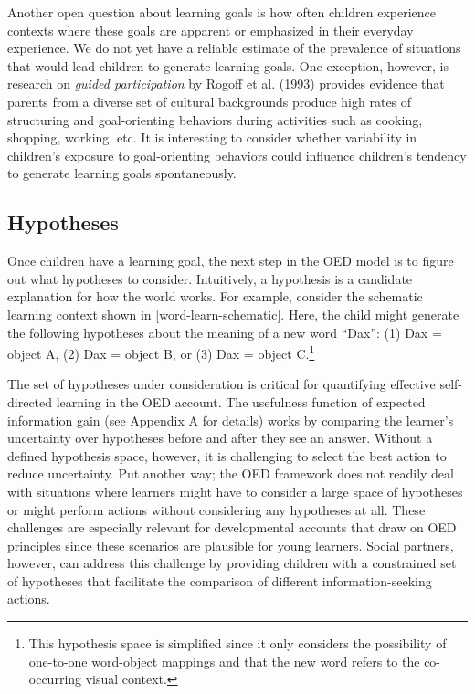 \documentclass[oneside]{report}
\begin{document}
Another open question about learning goals is how often children
experience contexts where these goals are apparent or emphasized in
their everyday experience. We do not yet have a reliable estimate of the
prevalence of situations that would lead children to generate learning
goals. One exception, however, is research on \emph{guided
participation} by Rogoff et al. (1993) provides evidence that parents
from a diverse set of cultural backgrounds produce high rates of
structuring and goal-orienting behaviors during activities such as
cooking, shopping, working, etc. It is interesting to consider whether
variability in children's exposure to goal-orienting behaviors could
influence children's tendency to generate learning goals spontaneously.

\subsection{Hypotheses}\label{hypotheses}

Once children have a learning goal, the next step in the OED model is to
figure out what hypotheses to consider. Intuitively, a hypothesis is a
candidate explanation for how the world works. For example, consider the
schematic learning context shown in \ref{word-learn-schematic}. Here,
the child might generate the following hypotheses about the meaning of a
new word ``Dax'': (1) Dax = object A, (2) Dax = object B, or (3) Dax =
object C.\footnote{This hypothesis space is simplified since it only
  considers the possibility of one-to-one word-object mappings and that
  the new word refers to the co-occurring visual context.}

The set of hypotheses under consideration is critical for quantifying
effective self-directed learning in the OED account. The usefulness
function of expected information gain (see Appendix A for details) works
by comparing the learner's uncertainty over hypotheses before and after
they see an answer. Without a defined hypothesis space, however, it is
challenging to select the best action to reduce uncertainty. Put another
way; the OED framework does not readily deal with situations where
learners might have to consider a large space of hypotheses or might
perform actions without considering any hypotheses at all. These
challenges are especially relevant for developmental accounts that draw
on OED principles since these scenarios are plausible for young
learners. Social partners, however, can address this challenge by
providing children with a constrained set of hypotheses that facilitate
the comparison of different information-seeking actions.
\end{document}
